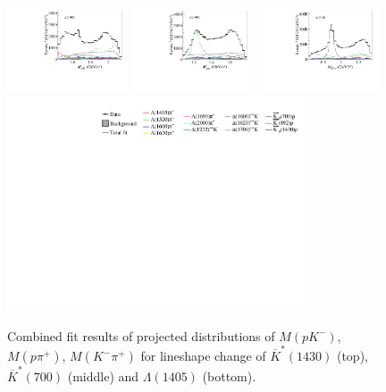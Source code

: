 \begin{figure}[htbp]
    \includegraphics[width=0.32\textwidth]{figure/lineshape/Lambda_1405/data_all_m_R_BC.pdf}
    \includegraphics[width=0.32\textwidth]{figure/lineshape/Lambda_1405/data_all_m_R_BD.pdf}
    \includegraphics[width=0.32\textwidth]{figure/lineshape/Lambda_1405/data_all_m_R_CD.pdf} \\
    \includegraphics[width=0.80\textwidth]{figure/pwa_nominal/legend.pdf}

    \caption{Combined fit results of projected distributions of $M(pK^-)$, $M(p\pi^+)$, $M(K^-\pi^+)$ for lineshape change of $\overline{K}^*(1430)$ (top), $\overline{K}^*(700)$ (middle) and $\Lambda(1405)$ (bottom). }
\label{fig:pwa_lineshape}
\end{figure}

